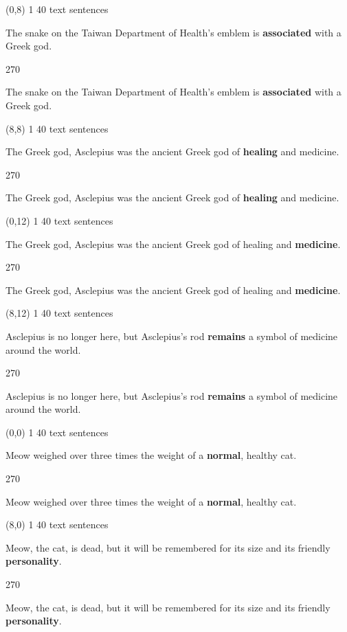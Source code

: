 \documentclass[a4paper]{article}
\newenvironment{itemize*}%
{\begin{itemize}%
 \setlength{\itemsep}{0.5cm}%
 \setlength{\parsep}{0pt}%
 \setlength{\parskip}{0pt}}%
{\end{itemize}}
\newcommand{\mycard}[3]{%
	\small #1 #2
	\par
	\parbox[t][6.8cm][c]{9.5cm}{%
	\par
	\myleft{#3}
	\par
	\myright{#3}
	}
}
\newcommand{\myleft}[1]{%
	\begin{sideways}
	\hspace*{-0.9cm}
		\parbox[t][2.7cm][t]{6.5cm}{%
		\large #1
		}
	\end{sideways}
}
\newcommand{\myright}[1]{%
	\hspace*{6.5cm}
	\begin{turn}{270}
	\hspace*{-7.1cm}
		\parbox[t][2.7cm][t]{6.5cm}{%
		\large #1
		}
	\end{turn}
}
\begin{document}
\begin{textblock}{8}(0,8)
\mycard{1}{40 text sentences}{
\begin{itemize*}
\item The snake on the Taiwan Department of Health's emblem is \textbf{associated} with a Greek god.
\end{itemize*}
}
\end{textblock}

\begin{textblock}{8}(8,8)
\mycard{1}{40 text sentences}{
\begin{itemize*}
\item The Greek god, Asclepius was the ancient Greek god of \textbf{healing} and medicine.
\end{itemize*}
}
\end{textblock}

\begin{textblock}{8}(0,12)
\mycard{1}{40 text sentences}{
\begin{itemize*}
\item The Greek god, Asclepius was the ancient Greek god of healing and \textbf{medicine}.
\end{itemize*}
}
\end{textblock}

\begin{textblock}{8}(8,12)
\mycard{1}{40 text sentences}{
\begin{itemize*}
\item Asclepius is no longer here, but Asclepius's rod \textbf{remains} a symbol of medicine around the world.
\end{itemize*}
}
\end{textblock}

\null
\newpage

\begin{textblock}{8}(0,0)
\mycard{1}{40 text sentences}{
\begin{itemize*}
\item Meow weighed over three times the weight of a \textbf{normal}, healthy cat.
\end{itemize*}
}
\end{textblock}

\begin{textblock}{8}(8,0)
\mycard{1}{40 text sentences}{
\begin{itemize*}
\item Meow, the cat, is dead, but it will be remembered for its size and its friendly \textbf{personality}.
\end{itemize*}
}
\end{textblock}
\end{document}
